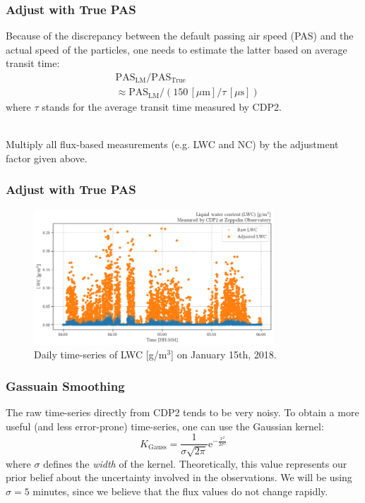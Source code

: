 \documentclass{beamer}
\begin{document}
\begin{frame}
    \frametitle{Adjust with True PAS}
    Because of the discrepancy between the default passing air speed (PAS) and the actual speed of the particles, one needs to estimate the latter based on average transit time:
    \begin{align*}
         & \mathrm{PAS}_\mathrm{LM} / \mathrm{PAS}_\mathrm{True}                                   \\
         & \approx \mathrm{PAS}_\mathrm{LM} / (150 \, [\mu \mathrm{m}] / \tau \, [\mu \mathrm{s}])
    \end{align*}
    where $\tau$ stands for the average transit time measured by CDP2.\\~\

    Multiply all flux-based measurements (e.g. LWC and NC) by the adjustment factor given above.
\end{frame}

\begin{frame}
    \frametitle{Adjust with True PAS}
    \begin{figure}
        \centering
        \includegraphics[width=0.8\textwidth]{img/pas.png}
        \caption{Daily time-series of LWC [g/m$^3$] on January 15th, 2018.}
    \end{figure}
\end{frame}

\begin{frame}
    \frametitle{Gassuain Smoothing}
    The raw time-series directly from CDP2 tends to be very noisy. To obtain a more useful (and less error-prone) time-series, one can use the Gaussian kernel:
    \begin{equation*}
        K_\mathrm{Gauss} = \frac{1}{\sigma \sqrt{2 \pi}} \mathrm{e}^{-\frac{x^2}{2 \sigma^2}}
    \end{equation*}
    where $\sigma$ defines the \emph{width} of the kernel. Theoretically, this value represents our prior belief about the uncertainty involved in the observations. We will be using $\sigma = 5$ minutes, since we believe that the flux values do not change rapidly.
\end{frame}
\end{document}
